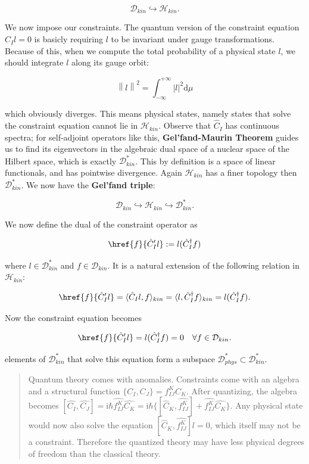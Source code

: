 \documentclass{article}
\begin{document}
$$
\mathcal{D}_{kin}\hookrightarrow \mathcal{H}_{kin}.
$$

We now impose our constraints. The quantum version of the constraint equation $\hat{C}_Il = 0$ is basicly requiring $l$ to be invariant under gauge transformations. Because of this, when we compute the total probability of a physical state $l$, we should integrate $l$ along its gauge orbit:

$$
\left\|l\right\|^2 = \int_{-\infty}^{+\infty}|l|^2\mathrm{d}\mu
$$

which obviously diverges. This means physical states, namely states that solve the constraint equation cannot lie in $\mathcal{H}_{kin}$. Observe that $\hat{C}_I$ has continuous spectra; for self-adjoint operators like this, \textbf{Gel'fand-Maurin Theorem} guides us to find its eigenvectors in the algebraic dual space of a nuclear space of the Hilbert space, which is exactly $\mathcal{D}^\ast_{kin}$. This by definition is a space of linear functionals, and has pointwise divergence. Again $\mathcal{H}_{kin}$ has a finer topology then $\mathcal{D}^\ast_{kin}$. We now have the \textbf{Gel'fand triple}:

$$
\mathcal{D}_{kin}\hookrightarrow \mathcal{H}_{kin}\hookrightarrow \mathcal{D}^\ast_{kin}.
$$

We now define the dual of the constraint operator as

$$
\href{f}{\hat{C}'_I l} := l(\hat{C}_I^\dagger f)
$$

where $l \in \mathcal{D}^\ast_{kin}$ and $f \in \mathcal{D}_{kin}$. It is a natural extension of the following relation in $\mathcal{H}_{kin}$:

$$
\href{f}{\hat{C}^\prime_I l} = \langle\hat{C}_I l, f\rangle_{kin} = \langle l, \hat{C}^\dagger_If\rangle_{kin} = l(\hat{C}_I^\dagger f).
$$

Now the constraint equation becomes

$$
\href{f}{\hat{C}'_I l} = l(\hat{C}_I^\dagger f) = 0\quad \forall f\in \mathcal{D}_{kin}.
$$

elements of $\mathcal{D}^\ast_{kin}$ that solve this equation form a subspace $\mathcal{D}^\ast_{phys}\subset \mathcal{D}^\ast_{kin}$.

\begin{quote}
Quantum theory comes with anomalies. Constraints come with an algebra and a structural function $\{C_I, C_J\} = f_{IJ}^KC_K$. After quantizing, the algebra becomes $[\hat{C_I}, \hat{C_J}] = \mathrm{i}\hbar\hat{f_{IJ}^K}\hat{C_K} = \mathrm{i}\hbar\{[\hat{C}_K, \hat{f_{IJ}^K}] + \hat{f_{IJ}^K}\hat{C_K}\}$. Any physical state would now also solve the equation $[\hat{C}_K, \hat{f_{IJ}^K}]l = 0$, which itself may not be a constraint. Therefore the quantized theory may have less physical degrees of freedom than the classical theory.
\end{quote}
\end{document}
